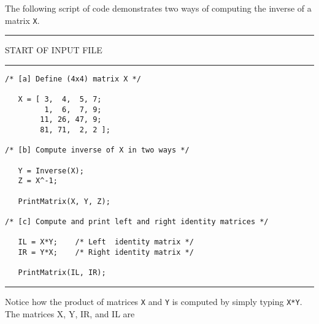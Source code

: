 \vspace{0.05 in}\noindent
The following script of code demonstrates two ways of computing
the inverse of a matrix {\tt X}.

\vspace{0.10 in}
\begin{footnotesize}
\noindent
{\rule{2.3 in}{0.035 in} START OF INPUT FILE \rule{2.3 in}{0.035 in} }
\begin{verbatim}
/* [a] Define (4x4) matrix X */

   X = [ 3,  4,  5, 7;
         1,  6,  7, 9;
        11, 26, 47, 9;
        81, 71,  2, 2 ];

/* [b] Compute inverse of X in two ways */

   Y = Inverse(X);
   Z = X^-1;

   PrintMatrix(X, Y, Z);

/* [c] Compute and print left and right identity matrices */

   IL = X*Y;    /* Left  identity matrix */
   IR = Y*X;    /* Right identity matrix */

   PrintMatrix(IL, IR);
\end{verbatim}
\rule{6.25 in}{0.035 in}
\end{footnotesize}

\vspace{0.15 in}\noindent
Notice how the product of matrices {\tt X} and {\tt Y} is computed
by simply typing {\tt X*Y}.
The matrices X, Y, IR, and IL are 

